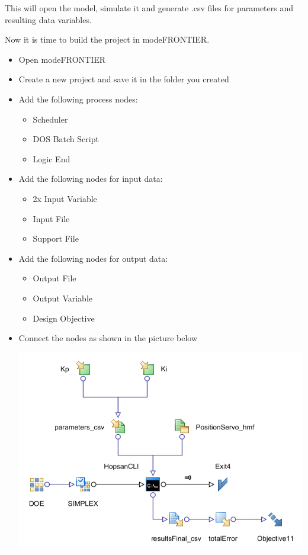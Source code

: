\documentclass[a4paper]{article}
\begin{document}
\begin{tutenumerate}
This will open the model, simulate it and generate .csv files for parameters and resulting data variables.


Now it is time to build the project in modeFRONTIER.

\begin{itemize}
\item Open modeFRONTIER
\item Create a new project and save it in the folder you created
\item Add the following process nodes:
\begin{itemize}
\item Scheduler
\item DOS Batch Script
\item Logic End
\end{itemize}
\item Add the following nodes for input data:
\begin{itemize}
\item 2x Input Variable
\item Input File
\item Support File
\end{itemize}
\item Add the following nodes for output data:
\begin{itemize}
\item Output File
\item Output Variable
\item Design Objective
\end{itemize}
\item Connect the nodes as shown in the picture below
\begin{center}
\includegraphics[scale=0.56]{gfx/modefrontier/model_final.png}\\
\end{center}
\end{itemize}



\end{tutenumerate}
\end{document}
